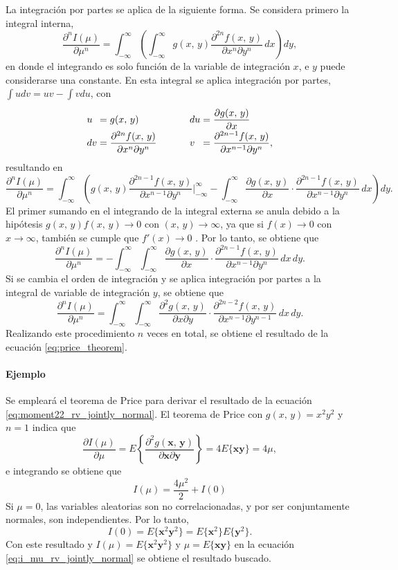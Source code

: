 \documentclass[a4paper]{report}
\newcommand{\x}{\mathbf{x}}
\newcommand{\y}{\mathbf{y}}
\begin{document}
La integración por partes se aplica de la siguiente forma. Se considera primero la integral interna, 
\[
 \frac{\partial^n I(\mu)}{\partial \mu^n}=\int_{-\infty}^{\infty}\left(\int_{-\infty}^{\infty}g(x,\,y)
 \frac{\partial^{2n}f(x,\,y)}{\partial x^n\partial y^n}\,dx\right)dy,
\]
en donde el integrando es solo función de la variable de integración \(x\), e \(y\) puede considerarse una constante. En esta integral se aplica integración por partes, \(\int udv=uv-\int vdu\), con
\[\arraycolsep=1.4pt\def\arraystretch{2.0}
 \begin{array}{lllp{1cm}lll}
   u&=&g(x,\,y)&  &du&=&\dfrac{\partial g(x,\,y)}{\partial x}\\
   dv&=&\dfrac{\partial^{2n}f(x,\,y)}{\partial x^n\partial y^n}&  &v&=&\dfrac{\partial^{2n-1}f(x,\,y)}{\partial x^{n-1}\partial y^n},
 \end{array}
\]
resultando en
\small
\[
 \frac{\partial^n I(\mu)}{\partial \mu^n}=
 \int_{-\infty}^{\infty}\left(g(x,\,y)\frac{\partial^{2n-1}f(x,\,y)}{\partial x^{n-1}\partial y^n}\bigg|_{-\infty}^{\infty}
 -\int_{-\infty}^{\infty}\dfrac{\partial g(x,\,y)}{\partial x}\cdot\frac{\partial^{2n-1}f(x,\,y)}{\partial x^{n-1}\partial y^n}
 \,dx\right)dy.
\]
\normalsize
El primer sumando en el integrando de la integral externa se anula debido a la hipótesis \(g(x,\,y)f(x,\,y)\to0\) con \((x,\,y)\to\infty\), ya que si \(f(x)\to0\) con \(x\to\infty\), también se cumple que \(f'(x)\to0\) \cite{landau1983hardy}. Por lo tanto, se obtiene que
\[
 \frac{\partial^n I(\mu)}{\partial \mu^n}=
 -\int_{-\infty}^{\infty}\int_{-\infty}^{\infty}\frac{\partial g(x,\,y)}{\partial x}\cdot\frac{\partial^{2n-1}f(x,\,y)}{\partial x^{n-1}\partial y^n}
 \,dx\,dy.
\]
Si se cambia el orden de integración y se aplica integración por partes a la integral de variable de integración \(y\), se obtiene que
\[
 \frac{\partial^n I(\mu)}{\partial \mu^n}=
 \int_{-\infty}^{\infty}\int_{-\infty}^{\infty}\frac{\partial^2 g(x,\,y)}{\partial x\partial y}\cdot\frac{\partial^{2n-2}f(x,\,y)}{\partial x^{n-1}\partial y^{n-1}}
 \,dx\,dy.
\]
Realizando este procedimiento \(n\) veces en total, se obtiene el resultado de la ecuación \ref{eq:price_theorem}.

\paragraph{Ejemplo} Se empleará el teorema de Price para derivar el resultado de la ecuación \ref{eq:moment22_rv_jointly_normal}. El teorema de Price con \(g(x,\,y)=x^2y^2\) y \(n=1\) indica que
\[
 \frac{\partial I(\mu)}{\partial\mu}=E\left\{\frac{\partial^2g(\x,\,\y)}{\partial \x\partial \y}\right\}=4E\{\x\y\}=4\mu,
\]
e integrando se obtiene que
\begin{equation}\label{eq:i_mu_rv_jointly_normal}
 I(\mu)=\frac{4\mu^2}{2}+I(0)
\end{equation}
Si \(\mu=0\), las variables aleatorias son no correlacionadas, y por ser conjuntamente normales, son independientes. Por lo tanto,
\[
 I(0)=E\{\x^2\y^2\}=E\{\x^2\}E\{\y^2\}.
\]
Con este resultado y \(I(\mu)=E\{\x^2\y^2\}\) y \(\mu=E\{\x\y\}\) en la ecuación \ref{eq:i_mu_rv_jointly_normal} se obtiene el resultado buscado.
\end{document}
